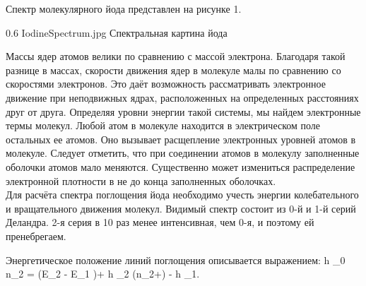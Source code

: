 Спектр молекулярного йода представлен на рисунке 1.

\pic
{0.6\linewidth}
{IodineSpectrum.jpg}
{Спектральная картина йода}

Массы ядер атомов велики по сравнению с массой электрона. Благодаря такой разнице в массах, скорости движения ядер
в молекуле малы по сравнению со скоростями электронов. Это даёт возможность рассматривать электронное движение при
неподвижных ядрах, расположенных на определенных расстояниях друг от друга. Определяя уровни энергии такой системы,
мы найдем электронные термы молекул. Любой атом в молекуле находится в электрическом поле остальных ее атомов.
Оно вызывает расщепление электронных уровней атомов в молекуле. Следует отметить, что при соединении атомов в
молекулу заполненные оболочки атомов мало меняются. Существенно может измениться распределение электронной плотности
в не до конца заполненных оболочках. \\

Для расчёта спектра поглощения йода необходимо учесть энергии колебательного и вращательного движения молекул.
Видимый спектр состоит из 0-й и 1-й серий Деландра. 2-я серия в 10 раз менее интенсивная, чем 0-я, и поэтому ей
пренебрегаем.

Энергетическое положение линий поглощения описывается выражением:
{
    h \nu_{0 n_2} = (E_2 - E_1 )+ h \nu_2 \left(n_2+\right) - h \nu_1.
}

